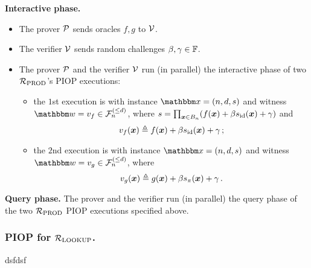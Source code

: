 \textbf{Interactive phase.} 
\begin{itemize}
    \item The prover $\mathcal{P}$ sends oracles $f, g$ to $\mathcal{V}$.
    \item The verifier $\mathcal{V}$ sends random challenges $\beta, \gamma \in \mathbb{F}$.
    \item The prover $\mathcal{P}$ and the verifier $\mathcal{V}$ run (in parallel) the interactive phase 
    of two ${\mathcal{R}}_{\text{PROD}}$'s PIOP executions:
        \begin{itemize}
            \item the $1$st execution is with instance $\instR = (n, d, s)$ and
                witness $\witR = v_{f} \in \bdp{n}{d}$, where 
                $
                    s = \prod_{\boldsymbol{x}\in B_{n}} (f(\boldsymbol{x}) + \beta s_{\text{id}}(\boldsymbol{x}) + \gamma)
                $ and
                \[
                    v_{f}(\boldsymbol{x}) \mathrel{\triangleq} f(\boldsymbol{x}) + \beta s_{\text{id}}(\boldsymbol{x}) + \gamma \,;
                \]
            \item the $2$nd execution is with instance $\instR = (n, d, s)$ and 
                witness $\witR = v_{g} \in \bdp{n}{d}$, where 
                \[
                    v_{g}(\boldsymbol{x}) \mathrel{\triangleq} g(\boldsymbol{x}) + \beta s_{\pi}(\boldsymbol{x}) + \gamma \,.
                \]
        \end{itemize}
\end{itemize}

\textbf{Query phase.}
The prover and the verifier run (in parallel) the query phase of the two ${\mathcal{R}}_{\text{PROD}}$ PIOP 
executions specified above.

\subsubsection*{PIOP for ${\mathcal{R}}_{\text{LOOKUP}}$.} 
dsfdsf
